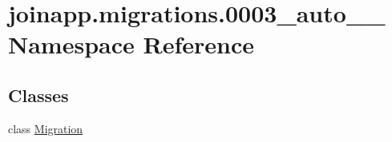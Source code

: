 \hypertarget{namespacejoinapp_1_1migrations_1_10003__auto__20190605__1445}{}\section{joinapp.\+migrations.0003\+\_\+auto\+\_\+\_ Namespace Reference}
\label{namespacejoinapp_1_1migrations_1_10003__auto__20190605__1445}
\subsection*{Classes}
\begin{DoxyCompactItemize}
\item 
class \mbox{\hyperlink{classjoinapp_1_1migrations_1_10003__auto__20190605__1445_1_1_migration}{Migration}}
\end{DoxyCompactItemize}
